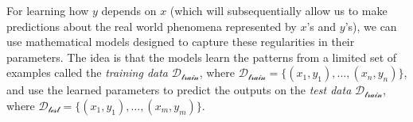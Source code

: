 For learning how $y$ depends on $x$ (which will subsequentially allow us to make predictions about the real world phenomena represented by $x$'s and $y$'s), we can use mathematical models designed to capture these regularities in their parameters. The idea is that the models learn the patterns from a limited set of examples called the \textit{training data} $\mathcal{D_{\text{train}}}$, where $\mathcal{D_{\text{train}}} = \{(x_1, y_1), \ldots, (x_{n}, y_{n})\}$, and use the learned parameters to predict the outputs on the \textit{test data} $\mathcal{D_{\text{train}}}$, where $\mathcal{D_{\text{test}}} = \{(x_1, y_1), \ldots, (x_{m}, y_{m})\}$.




